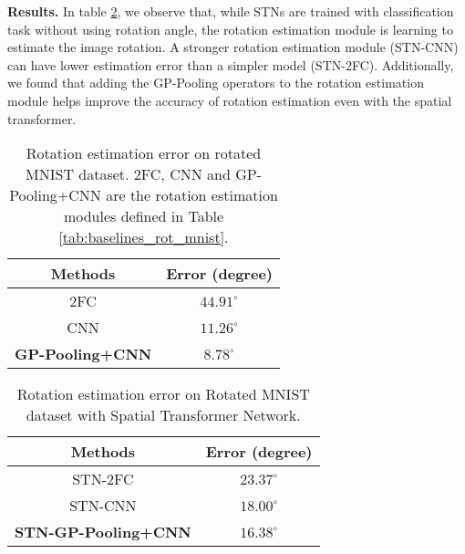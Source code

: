 \documentclass[10pt,twocolumn,letterpaper]{article}
\begin{document}
\vspace{1mm}\noindent\textbf{Results.} In table \ref{tab:exp1_mnist}, we observe 
that, while STNs are trained with classification task without using rotation angle, the rotation estimation module is learning to estimate the image rotation.
A stronger rotation estimation module (STN-CNN) can have lower estimation error than a simpler model (STN-2FC). Additionally, we found that adding the GP-Pooling operators to the rotation estimation module helps improve the accuracy of rotation estimation even with the spatial transformer.

\begin{table}[tb]
\footnotesize
\centering
\begin{tabular}{ |c|c| }
        \hline
        Methods & Error (degree) \\
        \hline
        \hline
        2FC           &       $44.91^{\circ}$               \\
        CNN           &   $11.26^{\circ}$         \\
        \textbf{GP-Pooling+CNN}   &   $\mathbf{8.78^{\circ}}$    \\
        \hline
\end{tabular}

\vspace{0.2cm}
\caption{Rotation estimation error on rotated MNIST dataset. 2FC, CNN and GP-Pooling+CNN are the rotation estimation modules defined in Table \ref{tab:baselines_rot_mnist}.}
\label{tab:exp2_mnist} 
\end{table}

\begin{table}[tb]
\centering
\footnotesize
\begin{tabular}{ |c|c| }
        \hline
        Methods & Error (degree) \\
        \hline
        \hline
        STN-2FC \cite{Jaderberg2015}       &   $23.37^{\circ}$        \\
        STN-CNN \cite{Jaderberg2015}       &   $18.00^{\circ}$        \\
        \textbf{STN-GP-Pooling+CNN}                 &   $\mathbf{16.38^{\circ}}$       \\
        \hline
\end{tabular}
\vspace{0.2cm}
\caption{Rotation estimation error on Rotated MNIST dataset with Spatial Transformer Network.}
\label{tab:exp1_mnist} 
\end{table}
\end{document}
